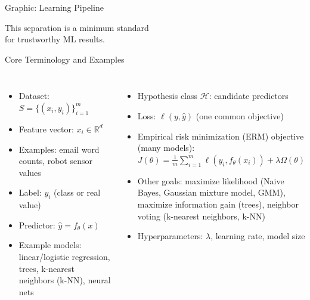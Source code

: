 \begin{frame}{Graphic: Learning Pipeline}
\centering
{}

\vspace{0.6em}
\pause
\footnotesize This separation is a minimum standard\\
\footnotesize for trustworthy ML results.
\end{frame}

\begin{frame}{Core Terminology and Examples}
\small
\begin{columns}[T]
\begin{itemize}
  \item Dataset: $S=\{(x_i,y_i)\}_{i=1}^m$
  \pause
  \item Feature vector: $x_i \in \mathbb{R}^d$
  \pause
  \item Examples: email word counts, robot sensor values
  \pause
  \item Label: $y_i$ (class or real value)
  \pause
  \item Predictor: $\hat{y}=f_\theta(x)$
  \pause
  \item Example models: linear/logistic regression, trees, k-nearest neighbors (k-NN), neural nets
\end{itemize}

\pause
{}
\begin{itemize}
  \item Hypothesis class $\mathcal{H}$: candidate predictors
  \pause
  \item Loss: $\ell(y,\hat{y})$ (one common objective)
  \pause
  \item Empirical risk minimization (ERM) objective (many models):\\
  $J(\theta)=\frac{1}{m}\sum_{i=1}^m \ell(y_i,f_\theta(x_i))+\lambda\Omega(\theta)$
  \pause
  \item Other goals: maximize likelihood (Naive Bayes, Gaussian mixture model, GMM), maximize information gain (trees), neighbor voting (k-nearest neighbors, k-NN)
  \pause
  \item Hyperparameters: $\lambda$, learning rate, model size
\end{itemize}
\end{columns}
\end{frame}


